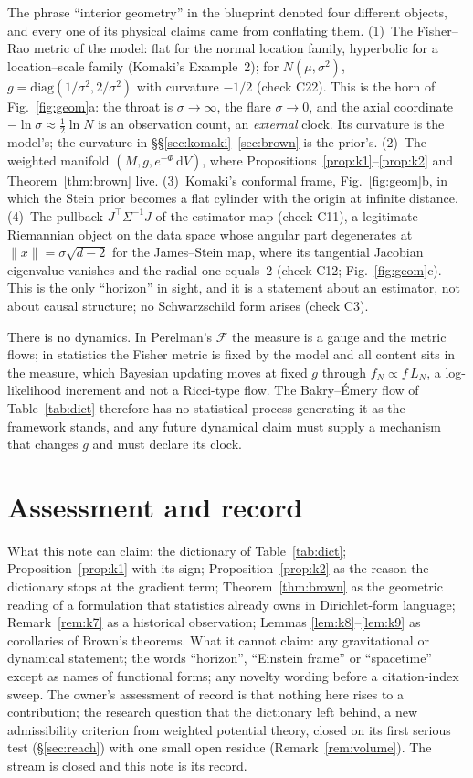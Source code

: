 \documentclass[a4paper,11pt,noarxiv]{quantumarticle}
\newcommand{\norm}[1]{\lVert #1\rVert}
\newcommand{\dd}{\,\mathrm{d}}
\theoremstyle{plain}
\theoremstyle{definition}
\theoremstyle{remark}
\begin{document}
The phrase ``interior geometry'' in the blueprint denoted four
different objects, and every one of its physical claims came from
conflating them. (1)~The Fisher--Rao metric of the model: flat for the
normal location family, hyperbolic for a location--scale family
(Komaki's Example~2); for $N(\mu,\sigma^2)$, $g=\mathrm{diag}(1/\sigma^2,
2/\sigma^2)$ with curvature $-1/2$ (check C22). This is the horn of
Fig.~\ref{fig:geom}a: the throat is $\sigma\to\infty$, the flare
$\sigma\to0$, and the axial coordinate $-\ln\sigma\approx\tfrac12\ln N$
is an observation count, an \emph{external} clock. Its curvature is the
model's; the curvature in \S\S\ref{sec:komaki}--\ref{sec:brown} is the
prior's. (2)~The weighted manifold $(M,g,e^{-\Phi}\dd V)$, where
Propositions~\ref{prop:k1}--\ref{prop:k2} and Theorem~\ref{thm:brown}
live. (3)~Komaki's conformal frame, Fig.~\ref{fig:geom}b, in which the
Stein prior becomes a flat cylinder with the origin at infinite
distance. (4)~The pullback $J^\top\Sigma^{-1}J$ of the estimator map
(check C11), a legitimate Riemannian object on the data space whose
angular part degenerates at $\norm x=\sigma\sqrt{d-2}$ for the
James--Stein map, where its tangential Jacobian eigenvalue vanishes and
the radial one equals~2 (check C12; Fig.~\ref{fig:geom}c). This is the
only ``horizon'' in sight, and it is a statement about an estimator,
not about causal structure; no Schwarzschild form arises (check C3).

There is no dynamics. In Perelman's $\mathcal F$ the measure is a gauge
and the metric flows; in statistics the Fisher metric is fixed by the
model and all content sits in the measure, which Bayesian updating
moves at fixed $g$ through $f_N\propto f\,L_N$, a log-likelihood
increment and not a Ricci-type flow. The Bakry--\'Emery flow of
Table~\ref{tab:dict} therefore has no statistical process generating
it as the framework stands, and any future dynamical claim must supply
a mechanism that changes $g$ and must declare its clock.

\section{Assessment and record}\label{sec:record}

What this note can claim: the dictionary of Table~\ref{tab:dict};
Proposition~\ref{prop:k1} with its sign; Proposition~\ref{prop:k2} as
the reason the dictionary stops at the gradient term;
Theorem~\ref{thm:brown} as the geometric reading of a formulation that
statistics already owns in Dirichlet-form language;
Remark~\ref{rem:k7} as a historical observation; Lemmas
\ref{lem:k8}--\ref{lem:k9} as corollaries of Brown's theorems. What it
cannot claim: any gravitational or dynamical statement; the words
``horizon'', ``Einstein frame'' or ``spacetime'' except as names of
functional forms; any novelty wording before a citation-index sweep.
The owner's assessment of record is that nothing here rises to a
contribution; the research question that the dictionary left behind,
a new admissibility criterion from weighted potential theory, closed
on its first serious test (\S\ref{sec:reach}) with one small open
residue (Remark~\ref{rem:volume}). The stream is closed and this note
is its record.
\end{document}

